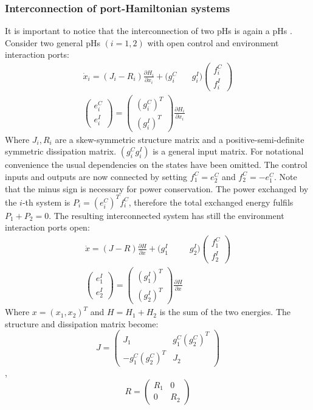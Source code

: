 \documentclass[a4paper,twoside, openright,12pt]{report}
\begin{document}
\subsubsection{Interconnection of port-Hamiltonian systems}
It is important to notice that the interconnection of two pHs is again a pHs \cite{Schaft_14}. Consider two general pHs $(i=1,2)$ with open control and environment interaction ports:
\begin{eqnarray}
	\dot{x}_i = (J_i - R_i)\frac{\partial H_i}{\partial x_i}+ (g_i^C & g_i^I)\begin{pmatrix}f_i^C \\ f_i^I\end{pmatrix}\\
	\begin{pmatrix}e_i^C \\ e_i^I\end{pmatrix} = \begin{pmatrix}(g_i^C)^T \\ (g_i^I)^T\end{pmatrix}\frac{\partial H_i}{\partial x_i}
\end{eqnarray}
Where $J_i,R_i$ are a skew-symmetric structure matrix and a positive-semi-definite symmetric dissipation matrix. $(g_i^C g_i^I)$ is a general input matrix.
For notational convenience the usual dependencies on the states have been omitted. The control inputs and outputs are now connected by setting $f_1^C = e_2^C $ and $ f_2^C = -e_1^C $. Note that the minus sign is necessary for power conservation. The power exchanged by the $i$-th system is $P_i = (e_i^C)^Tf_i^C$, therefore the total exchanged energy fulfils $ P_1 + P_2 = 0 $. The resulting interconnected system has still the environment interaction ports open:
\begin{eqnarray}
	\dot{x} = (J - R)\frac{\partial H}{\partial x}+ (g_1^I & g_2^I)\begin{pmatrix}f_1^C \\ f_2^I\end{pmatrix}\\
	\begin{pmatrix}e_1^I \\ e_2^I\end{pmatrix} = \begin{pmatrix}(g_1^I)^T \\ (g_2^I)^T\end{pmatrix}\frac{\partial H}{\partial x}
\end{eqnarray}
Where $ x = (x_1, x_2)^T $ and $ H = H_1 + H_2 $ is the sum of the two energies. The structure and dissipation matrix become:
\[J = \begin{pmatrix} J_1 & g_1^C(g_2^C)^T \\ 
-g_1^C(g_2^C)^T & J_2\end{pmatrix} \],
\[R = \begin{pmatrix}
R_1 & 0 \\ 0 & R_2\end{pmatrix}\]
\end{document}
